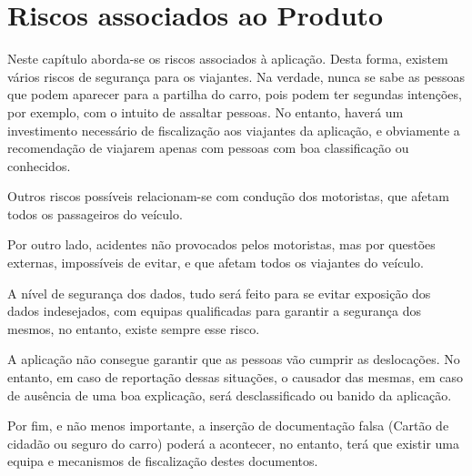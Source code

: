 \chapter{Riscos associados ao Produto}
\hspace{5mm} Neste capítulo aborda-se os riscos associados à aplicação. Desta forma, existem vários riscos de segurança para os viajantes. Na verdade, nunca se sabe as pessoas que podem aparecer para a partilha do carro, pois podem ter segundas intenções, por exemplo, com o intuito de assaltar pessoas. No entanto, haverá um investimento necessário de fiscalização aos viajantes da aplicação, e obviamente a recomendação de viajarem apenas com pessoas com boa classificação ou conhecidos.

\hspace{5mm} Outros riscos possíveis relacionam-se com condução dos motoristas, que afetam todos os passageiros do veículo.

\hspace{5mm} Por outro lado, acidentes não provocados pelos motoristas, mas por questões externas, impossíveis de evitar, e que afetam todos os viajantes do veículo.

\hspace{5mm} A nível de segurança dos dados, tudo será feito para se evitar exposição dos dados indesejados, com equipas qualificadas para garantir a segurança dos mesmos, no entanto, existe sempre esse risco.

\hspace{5mm} A aplicação não consegue garantir que as pessoas vão cumprir as deslocações. No entanto, em caso de reportação dessas situações, o causador das mesmas, em caso de ausência de uma boa explicação, será desclassificado ou banido da aplicação.

\hspace{5mm}Por fim, e não menos importante, a inserção de documentação falsa (Cartão de cidadão ou seguro do carro) poderá a acontecer, no entanto, terá que existir uma equipa e mecanismos de fiscalização destes documentos.



